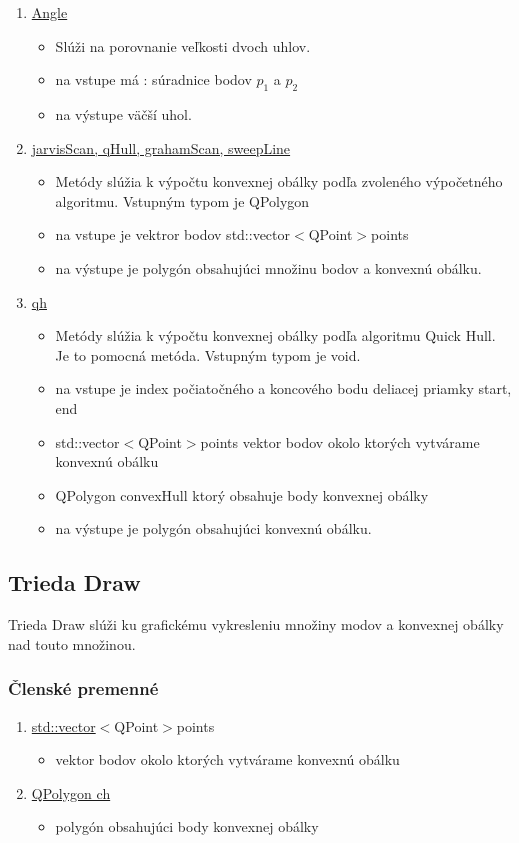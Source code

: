 \documentclass[12pt]{article}
\begin{document}
\begin{enumerate}
\item[] \underline{Angle}
\begin{itemize}
\item Slúži na porovnanie veľkosti dvoch uhlov. 
\item na vstupe má : súradnice bodov $p_1$ a $p_2$
\item na výstupe väčší uhol.
\end{itemize}

\item[] \underline{jarvisScan, qHull, grahamScan, sweepLine}
\begin{itemize}
\item Metódy slúžia k výpočtu konvexnej obálky podľa zvoleného výpočetného algoritmu. Vstupným typom je QPolygon
\item na vstupe je vektror bodov {std::vector}$<${QPoint}$>${points}
\item na výstupe je polygón obsahujúci množinu bodov a konvexnú obálku.
\end{itemize}

\item[] \underline{qh}
\begin{itemize}
\item Metódy slúžia k výpočtu konvexnej obálky podľa algoritmu Quick Hull. Je to pomocná metóda. Vstupným typom je void.
\item na vstupe je index počiatočného a koncového bodu deliacej priamky start, end
\item \hspace {1.5cm}  {std::vector}$<${QPoint}$>${points} vektor bodov okolo ktorých vytvárame konvexnú obálku
\item \hspace {1.5cm} QPolygon  convexHull ktorý obsahuje body konvexnej obálky
\item na výstupe je polygón obsahujúci konvexnú obálku.
\end{itemize}

\end{enumerate}

\subsection{Trieda Draw}
Trieda Draw slúži ku grafickému vykresleniu množiny modov a konvexnej obálky nad touto množinou.

\subsubsection{Členské premenné}
\begin{enumerate}

\item[] \underline {std::vector}$<${QPoint}$>${points}
\begin{itemize}
\item vektor bodov okolo ktorých vytvárame konvexnú obálku
\end{itemize}
\item[] \underline {QPolygon ch}
\begin{itemize}
\item polygón obsahujúci body konvexnej obálky
\end{itemize}
\end{enumerate}
\end{document}
